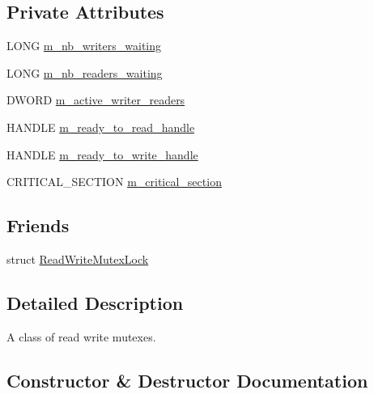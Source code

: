 \subsection*{Private Attributes}
\begin{DoxyCompactItemize}
\item 
L\+O\+NG \hyperlink{classmage_1_1_read_write_mutex_a003313794a9b43f80bd9b258b039438d}{m\+\_\+nb\+\_\+writers\+\_\+waiting}
\item 
L\+O\+NG \hyperlink{classmage_1_1_read_write_mutex_acbe7553fff7cca2656f6f2b8f0471484}{m\+\_\+nb\+\_\+readers\+\_\+waiting}
\item 
D\+W\+O\+RD \hyperlink{classmage_1_1_read_write_mutex_a1e0ad98e517236170faae5b27decfdce}{m\+\_\+active\+\_\+writer\+\_\+readers}
\item 
H\+A\+N\+D\+LE \hyperlink{classmage_1_1_read_write_mutex_a65c0ef8b687d48104b09a9d175e72236}{m\+\_\+ready\+\_\+to\+\_\+read\+\_\+handle}
\item 
H\+A\+N\+D\+LE \hyperlink{classmage_1_1_read_write_mutex_a9498ef85b52486342ba657f34369f89e}{m\+\_\+ready\+\_\+to\+\_\+write\+\_\+handle}
\item 
C\+R\+I\+T\+I\+C\+A\+L\+\_\+\+S\+E\+C\+T\+I\+ON \hyperlink{classmage_1_1_read_write_mutex_a77fe51b87e5205d60ea045fa53bc1fa3}{m\+\_\+critical\+\_\+section}
\end{DoxyCompactItemize}
\subsection*{Friends}
\begin{DoxyCompactItemize}
\item 
struct \hyperlink{classmage_1_1_read_write_mutex_a7ae207fc659160d3c55a5ba1468007f7}{Read\+Write\+Mutex\+Lock}
\end{DoxyCompactItemize}


\subsection{Detailed Description}
A class of read write mutexes. 

\subsection{Constructor \& Destructor Documentation}
\hypertarget{classmage_1_1_read_write_mutex_aae10694de3862f2d1059477169883940}{}\label{classmage_1_1_read_write_mutex_aae10694de3862f2d1059477169883940} 
